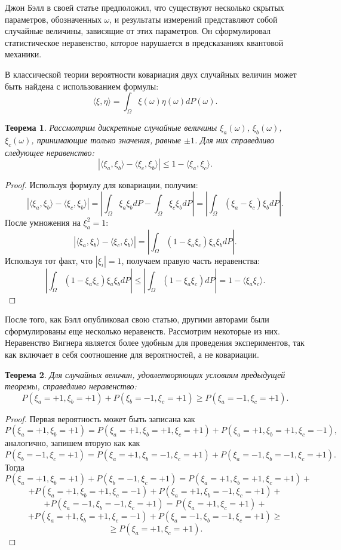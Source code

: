 \documentclass[%
master,         %
subf,           %
href,           %
colorlinks=true %
]{disser}
\numberwithin{equation}{section}
\numberwithin{figure}{section}
\newtheorem{theorem}{Теорема}[section]
\begin{document}
Джон Бэлл в своей статье \cite{Bell} предположил, что существуют несколько скрытых параметров, обозначенных $\omega$, и результаты измерений представляют собой случайные величины, зависящие от этих параметров. Он сформулировал статистическое неравенство, которое нарушается в предсказаниях квантовой механики. 

В классической теории вероятности ковариация двух случайных величин может быть найдена с использованием формулы:
\[
\langle \xi, \eta \rangle = \int_\Omega \xi(\omega)\eta(\omega)dP(\omega).
\]

\begin{theorem}
Рассмотрим дискретные случайные величины $\xi_a(\omega)$, $\xi_b(\omega)$, $\xi_c(\omega)$, принимающие только значения, равные $\pm 1$. Для них справедливо следующее неравенство:
\[
| \langle\xi_a,\xi_b\rangle -  \langle\xi_c,\xi_b\rangle | \leq 1 - \langle\xi_a,\xi_c\rangle.
\]
\end{theorem}

\begin{proof}
Используя формулу для ковариации, получим:
\[
| \langle\xi_a,\xi_b\rangle -  \langle\xi_c,\xi_b\rangle | = \left| \int_\Omega\xi_a\xi_b dP - \int_\Omega\xi_c\xi_b dP\right| = \left|\int_\Omega (\xi_a - \xi_c)\xi_bdP \right|.
\]
После умножения на $\xi_a^2 = 1$:
\[
| \langle\xi_a,\xi_b\rangle -  \langle\xi_c,\xi_b\rangle | = \left|\int_\Omega (1 - \xi_a\xi_c)\xi_a\xi_bdP \right|.
\]
Используя тот факт, что $|\xi_i| = 1$, получаем правую часть неравенства:
\[
\left|\int_\Omega (1 - \xi_a\xi_c)\xi_a\xi_bdP \right| \leq  \left|\int_\Omega (1 - \xi_a\xi_c)dP\right| = 1 - \langle \xi_a\xi_c\rangle.
\]
\end{proof}

После того, как Бэлл опубликовал свою статью, другими авторами были сформулированы еще несколько неравенств. Рассмотрим некоторые из них. Неравенство Вигнера является более удобным для проведения экспериментов, так как включает в себя соотношение для вероятностей, а не ковариации. 
\begin{theorem}
Для случайных величин, удовлетворяющих условиям предыдущей теоремы, справедливо неравенство:
\[
P(\xi_a = +1, \xi_b = +1) + P(\xi_b = -1, \xi_c = +1) \geq P(\xi_a = -1, \xi_c = +1).
\]
\end{theorem}

\begin{proof}
Первая вероятность может быть записана как
\[
P(\xi_a = +1, \xi_b = +1) = P(\xi_a = +1, \xi_b = +1, \xi_c = +1) + P(\xi_a = +1, \xi_b = +1, \xi_c = -1),
\]
аналогично, запишем вторую как как
\[
P(\xi_b = -1, \xi_c = +1) = P(\xi_a = +1, \xi_b = -1, \xi_c = +1) + P(\xi_a = -1, \xi_b = -1, \xi_c = +1).
\]
Тогда
\[
P(\xi_a = +1, \xi_b = +1) + P(\xi_b = -1, \xi_c = +1) = P(\xi_a = +1, \xi_b = +1, \xi_c = +1) + 
\] 
\[
 + P(\xi_a = +1, \xi_b = +1, \xi_c = -1) + P(\xi_a = +1, \xi_b = -1, \xi_c = +1) + 
\]
\[
 + P(\xi_a = -1, \xi_b = -1, \xi_c = +1) =  P(\xi_a = +1, \xi_c = +1) +
\]
\[
+  P(\xi_a = +1, \xi_b = +1, \xi_c = -1) + P(\xi_a = -1, \xi_b = -1, \xi_c = +1)\geq
\]
\[
 \geq P(\xi_a = +1, \xi_c = +1).
\]
\end{proof}
\end{document}
